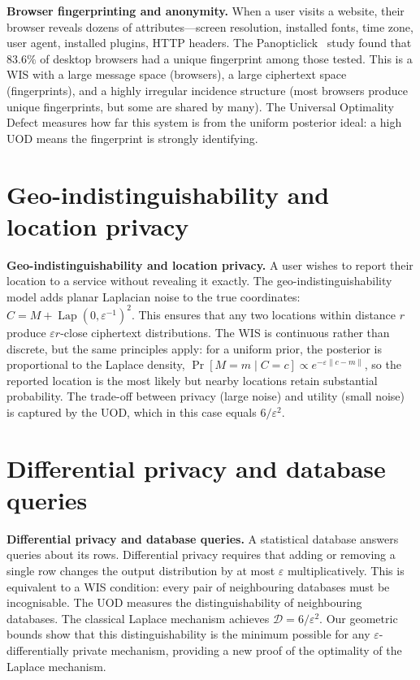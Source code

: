 \textbf{Browser fingerprinting and anonymity.}
When a user visits a website, their browser reveals dozens of
attributes---screen resolution, installed fonts, time zone, user
agent, installed plugins, HTTP headers.  The
Panopticlick~\cite{eckersley2010unique} study found that $83.6\%$ of
desktop browsers had a unique fingerprint among those tested.
This is a WIS with a large message space (browsers), a large
ciphertext space (fingerprints), and a highly irregular incidence
structure (most browsers produce unique fingerprints, but some are
shared by many).  The Universal Optimality Defect measures how far
this system is from the uniform posterior ideal: a high UOD means
the fingerprint is strongly identifying.

\section{Geo-indistinguishability and location privacy}\label{ch:sec:geo-indistinguishability-and-location-privacy}

\textbf{Geo-indistinguishability and location privacy.}
A user wishes to report their location to a service without revealing
it exactly.  The geo-indistinguishability model
\cite{andres2013geo} adds planar Laplacian noise to the true
coordinates: $C=M+\operatorname{Lap}(0,\varepsilon^{-1})^2$.  This
ensures that any two locations within distance $r$ produce
$\varepsilon r$-close ciphertext distributions.
The WIS is continuous rather than discrete, but the same principles
apply: for a uniform prior, the posterior is proportional to the
Laplace density, $\Pr[M=m\mid C=c]\propto e^{-\varepsilon\|c-m\|}$, so
the reported location is the most likely but nearby locations retain
substantial probability.  The trade-off between privacy (large noise) and
utility (small noise) is captured by the UOD, which in this case
equals $6/\varepsilon^2$.

\section{Differential privacy and database queries}\label{ch:sec:differential-privacy-and-database-queries}

\textbf{Differential privacy and database queries.}
A statistical database answers queries about its rows.  Differential
privacy \cite{dwork2006differential} requires that adding or removing
a single row changes the output distribution by at most $\varepsilon$
multiplicatively.  This is equivalent to a WIS condition: every pair
of neighbouring databases must be incognisable.
The UOD measures the distinguishability of neighbouring databases.
The classical Laplace mechanism achieves $\mathcal D=6/\varepsilon^2$.
Our geometric bounds show that this distinguishability is the minimum
possible for any $\varepsilon$-differentially private mechanism,
providing a new proof of the optimality of the Laplace mechanism.

